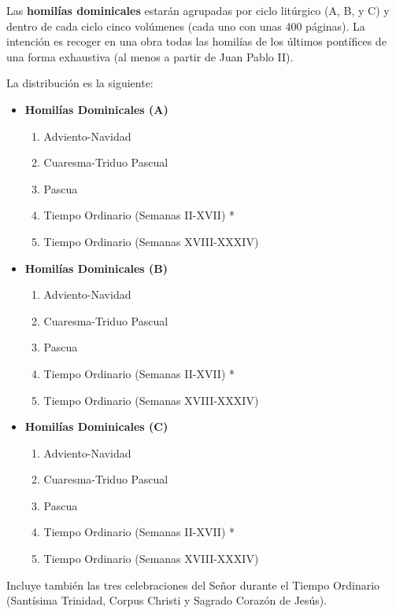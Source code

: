 \begin{bodyintro}
	Las \textbf{homilías dominicales} estarán agrupadas por ciclo litúrgico (A, B, y C) y dentro de cada ciclo cinco volúmenes (cada uno con unas 400 páginas). La intención es recoger en una obra todas las homilías de los últimos pontífices de una forma exhaustiva (al menos a partir de Juan Pablo II).
	
	La distribución es la siguiente:

\begin{itemize}
	\item \textbf {Homilías Dominicales (A)}
	\begin{enumerate}
		\renewcommand{\labelenumii}{\arabic{enumii}.}
		\item Adviento-Navidad
		\item Cuaresma-Triduo Pascual
		\item Pascua
		\item Tiempo Ordinario (Semanas II-XVII) *
		\item Tiempo Ordinario (Semanas XVIII-XXXIV)
	\end{enumerate}
\end{itemize}

\begin{itemize}
	\item \textbf {Homilías Dominicales (B)}
	\begin{enumerate}
		\renewcommand{\labelenumii}{\arabic{enumii}.}
		\item Adviento-Navidad
		\item Cuaresma-Triduo Pascual
		\item Pascua
		\item Tiempo Ordinario (Semanas II-XVII) *
		\item Tiempo Ordinario (Semanas XVIII-XXXIV)
	\end{enumerate}
\end{itemize}

\begin{itemize}
	\item \textbf {Homilías Dominicales (C)}
	\begin{enumerate}
		\renewcommand{\labelenumii}{\arabic{enumii}.}
		\item Adviento-Navidad
		\item Cuaresma-Triduo Pascual
		\item Pascua
		\item Tiempo Ordinario (Semanas II-XVII) *
		\item Tiempo Ordinario (Semanas XVIII-XXXIV)
	\end{enumerate}
\end{itemize}


	\small *Incluye también las tres celebraciones del Señor durante el Tiempo Ordinario (Santísima Trinidad, Corpus Christi y Sagrado Corazón de Jesús).
\end{bodyintro}
